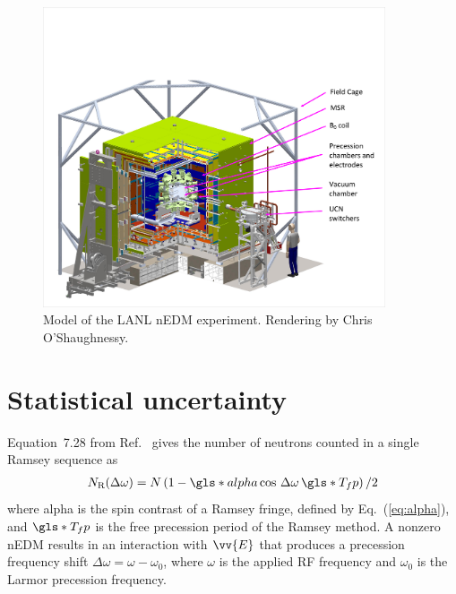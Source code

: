 \begin{figure}
    \centering
    \includegraphics[width=0.9\textwidth]{figures/envisioned_lanl_nedm.pdf}
    \caption[Model of the LANL nEDM experiment.]
    {Model of the LANL nEDM experiment. Rendering by Chris O'Shaughnessy.}
    \label{fig:envisioned_lanl_nedm}
\end{figure}


\section{Statistical uncertainty}\label{sec:figure_of_merit}


Equation~7.28 from Ref.~\cite{golubUCN} gives the number of neutrons counted in a single Ramsey sequence as
%
\begin{gather}
    N_\text{R}(\Delta \omega) = N \left( 1 - \gls*{alpha} \cos \,\Delta \omega \, \gls*{T_fp} \right)/2 \label{eq:neutrons_in_ramsey_seq}
\end{gather}
%
where \gls*{alpha} is the spin contrast of a Ramsey fringe, defined by Eq.~(\ref{eq:alpha}), and $\gls*{T_fp}$ is the free precession period of the Ramsey method. A nonzero nEDM results in an interaction with $\vv{E}$ that produces a precession frequency shift $\Delta\omega=\omega-\omega_0$, where $\omega$ is the applied RF frequency and $\omega_0$ is the Larmor precession frequency. 

